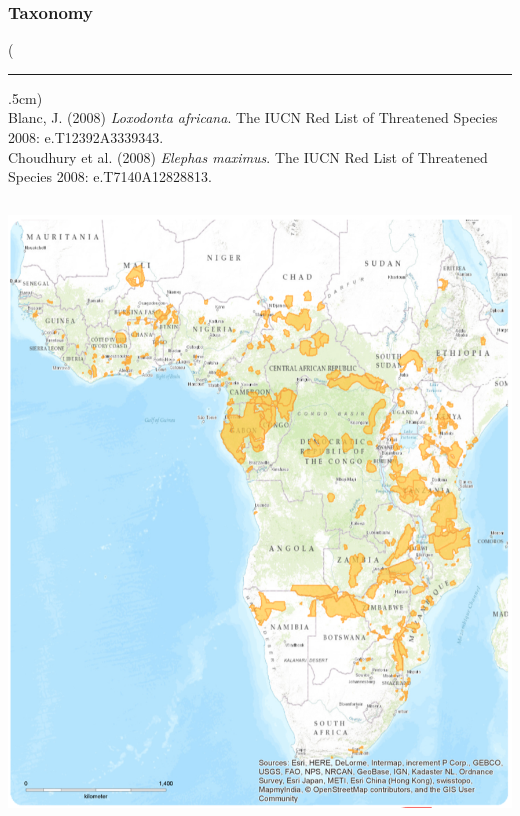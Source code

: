 \documentclass[10pt]{beamer}
\newenvironment{reference}[2]{%
	\begin{textblock*}{\textwidth}(#1,#2)
		\tiny\bgroup\color{gray}}{\egroup\end{textblock*}}
\begin{document}
\begin{frame}[t]
\frametitle{Taxonomy}
\vspace{0.25cm}

	\begin{reference}{4mm}{86mm}
		\rule{1.5cm}{0.25pt}\\
		Blanc, J. (2008) \emph{Loxodonta africana}. The IUCN Red List of Threatened Species 2008: e.T12392A3339343.\\
		Choudhury et al. (2008) \emph{Elephas maximus}. The IUCN Red List of Threatened Species 2008: e.T7140A12828813.
	\end{reference}

	\begin{columns}
		\begin{column}{0.5\textwidth}
			\begin{center}
				\includegraphics[width=1.0\textwidth]{figures/africa_range.png}
			\end{center}
		\end{column}
		

\end{columns}
\end{frame}
\end{document}
